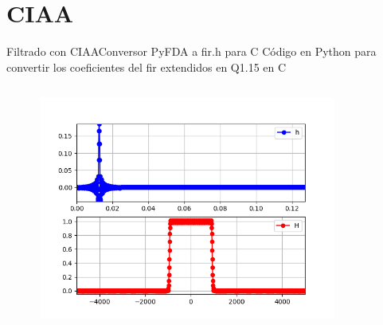 \section{CIAA}
\begin{frame}[t]{Filtrado con CIAA}{Conversor PyFDA a fir.h para C}
   \handsonicon
   Código en Python para convertir los coeficientes del fir extendidos en Q1.15 en C
   \begin{columns}[c]
      \hspace{2pt}
      \begin{column}{.3\textwidth}
         
      \end{column}
      \hspace{2pt}
      \vrule
      \hspace{2pt}
      \begin{column}{.3\textwidth}
         
      \end{column}
      \hspace{2pt}
      \vrule
      \hspace{2pt}
      \begin{column}{.4\textwidth}
         \includegraphics[width=0.8\textwidth]{5_clase/fir_to_c.png}
      \end{column}
      \hspace{2pt}
   \end{columns}
   \vfill
\end{frame}
